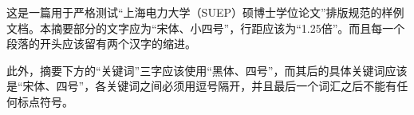 \begin{cnabstract}
这是一篇用于严格测试“上海电力大学（SUEP）硕博士学位论文”排版规范的样例文档。本摘要部分的文字应为“宋体、小四号”，行距应该为“1.25倍”。而且每一个段落的开头应该留有两个汉字的缩进。

此外，摘要下方的“关键词”三字应该使用“黑体、四号”，而其后的具体关键词应该是“宋体、四号”，各关键词之间必须用逗号隔开，并且最后一个词汇之后不能有任何标点符号。

\end{cnabstract}
